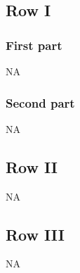 \documentclass[9pt]{article}
\numberwithin{equation}{section}
\begin{document}
\subsection{Row I}
\subsubsection{First part}
\textsc{NA}
\subsubsection{Second part}
\textsc{NA}
\subsection{Row II}
\textsc{NA}
\subsection{Row III}
\textsc{NA}
\end{document}
